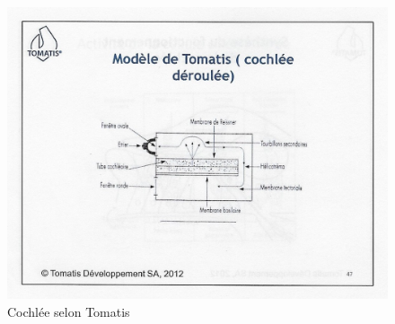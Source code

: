  \begin{figure}
	\centering
	\includegraphics[width=0.7\linewidth]{images/Cochleederoule_haut.jpg}
	\caption[Cochlée selon Tomatis]{Cochlée selon Tomatis}
	\label{fig:cochleederoulehaut}
      \end{figure}

